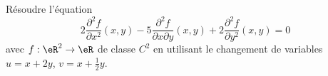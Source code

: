 \begin{exercice}[\boringexo]\label{exoCalculDifferentiel0013}

Résoudre l'équation
\begin{equation}
2\displaystyle \frac{\partial ^2 f}{\partial x^2}(x,y) - 5\displaystyle \frac{\partial ^2 f}{\partial x \partial y}(x,y) + 2\displaystyle \frac{\partial ^2 f}{\partial y^2}(x,y) =0
\end{equation}
avec $ f:\eR^2 \to \eR $ de classe $C^2$ en utilisant le changement de variables $u=x+2y$, $v=x+\frac 12 y$.

\end{exercice}
